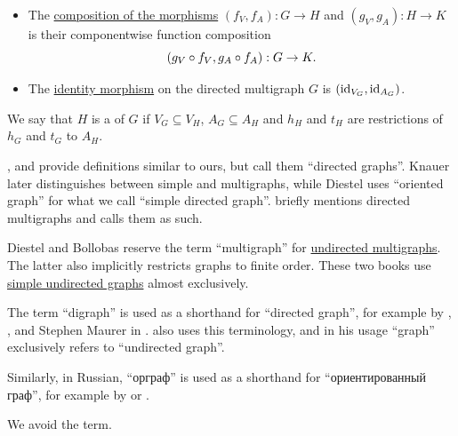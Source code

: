 \begin{definition}
\begin{thmenum}[resume=def:directed_multigraph]
\begin{itemize}
      \item The \hyperref[def:category/composition]{composition of the morphisms} \( (f_V, f_A): G \to H \) and \( (g_V, g_A): H \to K \) is their componentwise function composition
      \begin{equation*}
        (g_V \bincirc f_V, g_A \bincirc f_A): G \to K.
      \end{equation*}

      \item The \hyperref[def:category/identity]{identity morphism} on the directed multigraph \( G \) is \( (\operatorname{id}_{V_G}, \operatorname{id}_{A_G}) \).
    \end{itemize}

     We say that \( H \) is a  of \( G \) if \( V_G \subseteq V_H \), \( A_G \subseteq A_H \) and \( h_H \) and \( t_H \) are restrictions of \( h_G \) and \( t_G \) to \( A_H \).
  \end{thmenum}
\end{definition}
\begin{comments}
  \item {},  and  provide definitions similar to ours, but call them \enquote{directed graphs}. Knauer later distinguishes between simple and multigraphs, while Diestel uses \enquote{oriented graph} for what we call \enquote{simple directed graph}.  briefly mentions directed multigraphs and calls them as such.

  Diestel and Bollobas reserve the term \enquote{multigraph} for \hyperref[def:hypergraph/multigraph]{undirected multigraphs}. The latter also implicitly restricts graphs to finite order. These two books use \hyperref[def:undirected_graph]{simple undirected graphs} almost exclusively.
\end{comments}

\begin{remark}\label{rem:digraph}
  The term \enquote{digraph} is used as a shorthand for \enquote{directed graph}, for example by , ,  and Stephen Maurer in \cite[559]{Rosen1999DiscreteHandbook}.  also uses this terminology, and in his usage \enquote{graph} exclusively refers to \enquote{undirected graph}.

  Similarly, in Russian, \enquote{орграф} is used as a shorthand for \enquote{ориентированный граф}, for example by  or .

  We avoid the term.
\end{remark}


